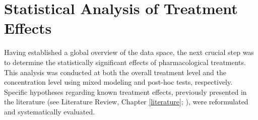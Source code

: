 \documentclass{report}
\begin{document}



\section{Statistical Analysis of Treatment Effects} 
    \label{chap:statistical_analysis}

    Having established a global overview of the data space, the next crucial step was to determine the statistically significant effects of pharmacological treatments. This analysis was conducted at both the overall treatment level and the concentration level using mixed modeling and post-hoc tests, respectively. Specific hypotheses regarding known treatment effects, previously presented in the literature (see Literature Review, Chapter \ref{literature}; \cite{Kawatou2017-gh, Min2024-nc}), were reformulated and systematically evaluated.
\end{document}
